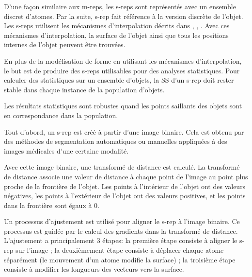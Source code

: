 
D'une façon similaire aux m-reps, les s-reps sont représentés avec un ensemble discret d'atomes.
Par la suite, s-rep fait référence à la version discrète de l'objet.
Les s-reps utilisent les mécanismes d'interpolation décrits dans \cite{damon2003smoothness},
\cite{han2006interpolation}, \cite{damon2008swept}. 
Avec ces mécanismes d'interpolation, la surface de l'objet ainsi que tous les positions internes de l'objet peuvent être trouvées.

En plus de la modélisation de forme en utilisant les mécanismes d'interpolation, le but est de produire des s-reps utilisables pour des analyses statistiques.
Pour calculer des statistiques sur un ensemble d'objets, la SS d'un s-rep doit rester stable dans chaque instance de la population d'objets.

Les résultats statistiques sont robustes quand les points saillants des objets sont en correspondance dans la population.

Tout d'abord, un s-rep est créé à partir d'une image binaire.
Cela est obtenu par des méthodes de segmentation automatiques ou manuelles
appliquées à des images médicales d'une certaine modalité.

Avec cette image binaire, une transformé de distance est calculé. 
La transformé de distance associe une valeur de distance à chaque point de l'image au point plus proche de la frontière de l'objet. 
Les points à l'intérieur de l'objet ont des valeurs négatives, les points à l'extérieur de l'objet ont des valeurs positives, et les points dans la frontière sont égaux à 0.

Un processus d'ajustement est utilisé pour aligner le s-rep à l'image binaire. 
Ce processus est guidée par le calcul des gradients dans la transformé de distance.
L'ajustement a principalement 3 étapes: la première étape consiste à aligner le s-rep sur l'image ; 
la deuxièmement étape consiste à déplacer chaque atome séparément (le mouvement d'un atome modifie la surface) ; 
la troisième étape consiste à modifier les longueurs des vecteurs vers la surface.

